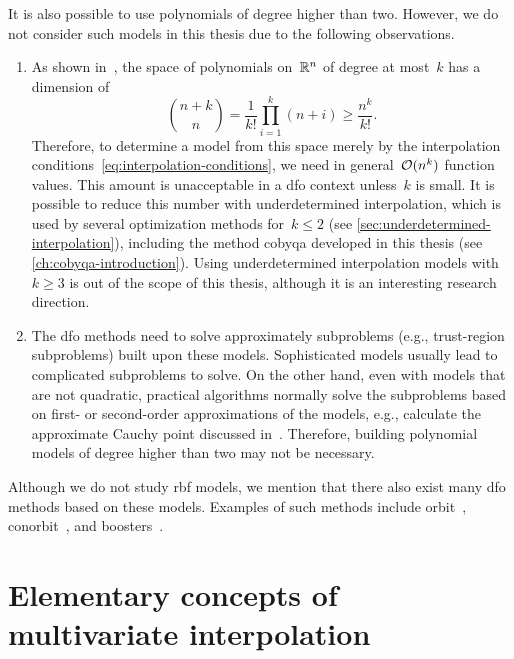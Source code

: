 It is also possible to use polynomials of degree higher than two.
However, we do not consider such models in this thesis due to the following observations.
\begin{enumerate}
    \item As shown in~\cite[thm.~2.5]{Wendland_2005}, the space of polynomials on~$\mathbb{R}^n$ of degree at most~$k$ has a dimension of
    \begin{equation*}
        \binom{n + k}{n} = \frac{1}{k!} \prod_{i = 1}^k (n + i) \ge \frac{n^k}{k!}.
    \end{equation*}
    Therefore, to determine a model from this space merely by the interpolation conditions~\cref{eq:interpolation-conditions}, we need in general~$\operatorname{\mathcal{O}}(n^k)$ function values.
    This amount is unacceptable in a \gls{dfo} context unless~$k$ is small.
    It is possible to reduce this number with underdetermined interpolation, which is used by several optimization methods for~$k \le 2$ (see \cref{sec:underdetermined-interpolation}), including the method \gls{cobyqa} developed in this thesis (see \cref{ch:cobyqa-introduction}).
    Using underdetermined interpolation models with~$k \ge 3$ is out of the scope of this thesis, although it is an interesting research direction.
    \item The \gls{dfo} methods need to solve approximately subproblems (e.g., trust-region subproblems) built upon these models.
    Sophisticated models usually lead to complicated subproblems to solve.
    On the other hand, even with models that are not quadratic, practical algorithms normally solve the subproblems based on first- or second-order approximations of the models, e.g., calculate the approximate Cauchy point discussed in~\cite[\S~6.3.3]{Conn_Gould_Toint_2000}.
    Therefore, building polynomial models of degree higher than two may not be necessary.
\end{enumerate}

Although we do not study \gls{rbf} models, we mention that there also exist many \gls{dfo} methods based on these models.
Examples of such methods include \gls{orbit}~\cite{Wild_Regis_Shoemaker_2008}, \gls{conorbit}~\cite{Regis_Wild_2017}, and \gls{boosters}~\cite{Oeuvray_Bierlaire_2009}.

\section{Elementary concepts of multivariate interpolation}
\label{sec:multivariate-interpolation}

